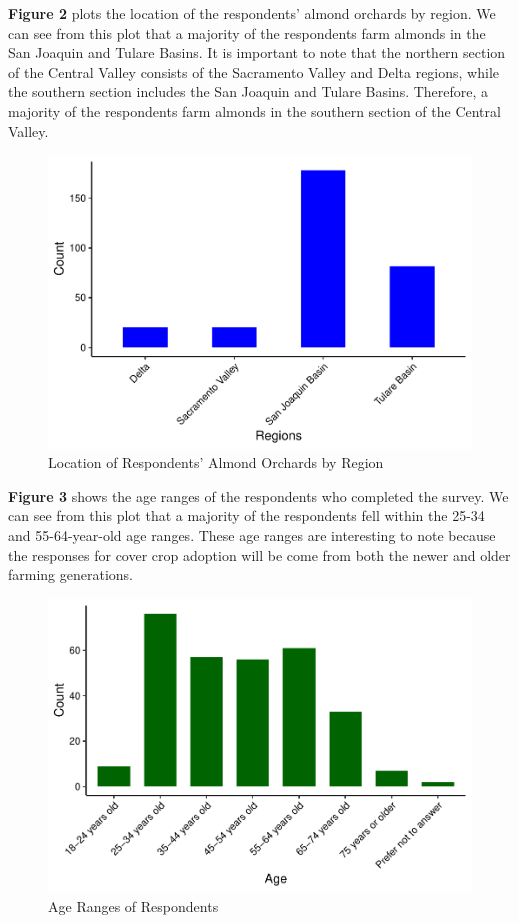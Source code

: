 \documentclass[12pt,]{article}
\begin{document}
\newpage

\textbf{Figure 2} plots the location of the respondents' almond orchards
by region. We can see from this plot that a majority of the respondents
farm almonds in the San Joaquin and Tulare Basins. It is important to
note that the northern section of the Central Valley consists of the
Sacramento Valley and Delta regions, while the southern section includes
the San Joaquin and Tulare Basins. Therefore, a majority of the
respondents farm almonds in the southern section of the Central Valley.

\begin{figure}
\centering
\includegraphics{Project_Template_files/figure-latex/unnamed-chunk-3-1.pdf}
\caption{Location of Respondents' Almond Orchards by Region}
\end{figure}

\newpage

\textbf{Figure 3} shows the age ranges of the respondents who completed
the survey. We can see from this plot that a majority of the respondents
fell within the 25-34 and 55-64-year-old age ranges. These age ranges
are interesting to note because the responses for cover crop adoption
will be come from both the newer and older farming generations.

\begin{figure}
\centering
\includegraphics{Project_Template_files/figure-latex/respondent age-1.pdf}
\caption{Age Ranges of Respondents}
\end{figure}
\end{document}
